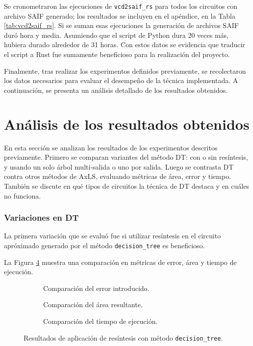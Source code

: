 Se cronometraron las ejecuciones de \texttt{vcd2saif\_rs} para todos los
circuitos con archivo SAIF generado; los resultados se incluyen en el apéndice,
en la Tabla \ref{tab:vcd2saif_rs}.
Si se suman esas ejecuciones la generación de archivos SAIF duró hora y media.
Asumiendo que el script de Python dura 20 veces más, hubiera durado alrededor
de 31 horas. Con estos datos se evidencia que traducir el script a Rust fue
sumamente beneficioso para la realización del proyecto.

Finalmente, tras realizar los experimentos definidos previamente, se
recolectaron los datos necesarios para evaluar el desempeño de la técnica
implementada. A continuación, se presenta un análisis detallado de los
resultados obtenidos.

\section{Análisis de los resultados obtenidos}

En esta sección se analizan los resultados de los experimentos descritos
previamente. Primero se comparan variantes del método DT: con o sin resíntesis,
y usando un solo árbol multi-salida o uno por salida. Luego se contrasta DT
contra otros métodos de AxLS, evaluando métricas de área, error y tiempo.
También se discute en qué tipos de circuitos la técnica de DT destaca y en
cuáles no funciona.

\subsubsection{Variaciones en DT}

La primera variación que se evaluó fue si utilizar resíntesis en el circuito
apróximado generado por el método \texttt{decision\_tree} es beneficioso.

La Figura \ref{fig:resynth} muestra una comparación en métricas de error, área y
tiempo de ejecución.

\begin{figure}
  \centering
  \begin{subfigure}{\textwidth}
    \centering
    
    \caption{Comparación del error introducido.}
    \label{fig:resynth_mred}
  \end{subfigure}
  \begin{subfigure}{\textwidth}
    \centering
    
    \caption{Comparación del área resultante.}
    \label{fig:resynth_area}
  \end{subfigure}
  \begin{subfigure}{\textwidth}
    \centering
    
    \caption{Comparación del tiempo de ejecución.}
    \label{fig:resynth_time}
  \end{subfigure}
  \caption{Resultados de aplicación de resíntesis con método \texttt{decision\_tree}.}
  \label{fig:resynth}
\end{figure}




